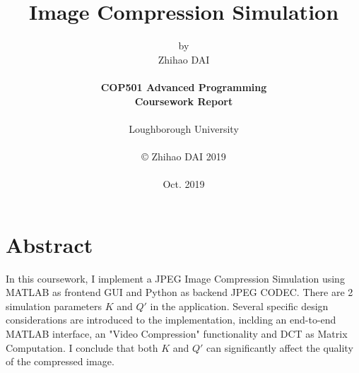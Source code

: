 \title{Image Compression Simulation}

\author{by\\Zhihao DAI\\
\\
{\bf COP501 Advanced Programming}\\
{\bf Coursework Report}\\
\\
Loughborough University\\
\\
\copyright
\hspace{1 dd} Zhihao DAI 2019\\
\\
Oct. 2019
}
\date{} %

\maketitle


% 
% 

\chapter*{Abstract}
In this coursework, I implement a JPEG Image Compression Simulation using MATLAB as frontend GUI and Python as backend JPEG CODEC. There are 2 simulation parameters $K$ and $Q'$ in the application. 
Several specific design considerations are introduced to the implementation, inclding an end-to-end MATLAB interface, an "Video Compression" functionality and DCT as Matrix Computation.
I conclude that both $K$ and $Q'$ can significantly affect the quality of the compressed image.



